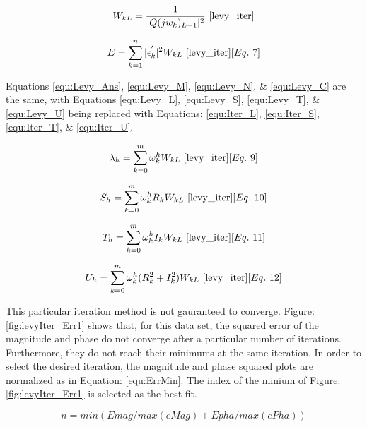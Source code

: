 \begin{equation}
\label{equ:iter_Weight}
W_{kL} = \frac{1}{|Q(jw_k)_{L-1}|^2}
~\cite{levy_iter}
\end{equation}

\begin{equation}
\label{equ:iter_Err}
E = \sum_{k=1}^{n} |\epsilon _k ^{'}|^2W_{kL}
~\cite{levy_iter}[Eq.~7]
\end{equation}

Equations \eqref{equ:Levy_Ans}, \eqref{equ:Levy_M}, \eqref{equ:Levy_N}, \& \eqref{equ:Levy_C} are the same, with Equations \eqref{equ:Levy_L}, \eqref{equ:Levy_S}, \eqref{equ:Levy_T}, \& \eqref{equ:Levy_U} being replaced with Equations: \eqref{equ:Iter_L}, \eqref{equ:Iter_S}, \eqref{equ:Iter_T}, \& \eqref{equ:Iter_U}.

\begin{equation}
\label{equ:Iter_L}
\lambda _h = \sum_{k=0}^{m} \omega _k ^hW_{kL}
~\cite{levy_iter}[Eq.~9]
\end{equation}

\begin{equation}
\label{equ:Iter_S}
S_h = \sum_{k=0}^{m} \omega _k ^h R_kW_{kL}
~\cite{levy_iter}[Eq.~10]
\end{equation}

\begin{equation}
\label{equ:Iter_T}
T_h = \sum_{k=0}^{m} \omega _k ^h I_kW_{kL}
~\cite{levy_iter}[Eq.~11]
\end{equation}

\begin{equation}
\label{equ:Iter_U}
U_h = \sum_{k=0}^{m} \omega _k ^h (R_k ^2 + I_k ^2)W_{kL}
~\cite{levy_iter}[Eq.~12]
\end{equation}


This particular iteration method is not gauranteed to converge. Figure: \ref{fig:levyIter_Err1} shows that, for this data set, the squared error of the magnitude and phase do not converge after a particular number of iterations. Furthermore, they do not reach their minimums at the same iteration. In order to select the desired iteration, the magnitude and phase squared plots are normalized as in Equation: \eqref{equ:ErrMin}. The index of the minium of Figure: \ref{fig:levyIter_Err1} is selected as the best fit.

\begin{equation}
\label{equ:ErrMin}
n = min(Emag/max(eMag) + Epha/max(ePha))
\end{equation}




